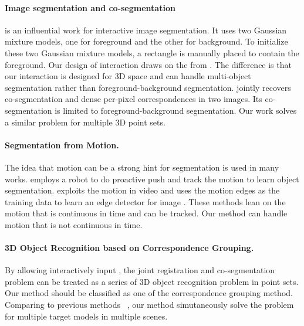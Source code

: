 \paragraph{Image segmentation and co-segmentation}
\cite{grabcut} is an influential work for interactive image segmentation. It uses two Gaussian mixture models, one for foreground and the other for background. 
To initialize these two Gaussian mixture models, a rectangle is manually placed to contain the foreground. Our design of interaction draws on the  from \cite{grabcut}. 
%
The difference is that our interaction is designed for 3D space and can handle multi-object segmentation rather than foreground-background segmentation. \cite{Taniai_2016_CVPR} jointly recovers co-segmentation and dense per-pixel correspondences in two images. 
Its co-segmentation is limited to foreground-background segmentation. Our work solves a similar problem for multiple 3D point sets. 

\paragraph{Segmentation from Motion.}
The idea that motion can be a strong hint for segmentation is used in many works.\cite{Xu:2015:ACS:2816795.2818075} employs a robot to do proactive push and track the motion to learn object segmentation. \cite{unsupervisededge} exploits the motion in  video and uses the motion edges as the training data to learn an edge detector for image . 
These methods lean on the motion that is continuous in time and can be tracked. Our method can handle motion that is not continuous in time.

\paragraph{3D Object Recognition based on Correspondence Grouping.}
By allowing interactively input , the joint registration and co-segmentation problem can be treated as a series of 3D object recognition problem in point sets. Our method should be classified as one of the correspondence grouping method. Comparing to previous methods ~\cite{hough,LOF}, our method simutaneously  solve the problem for multiple target models in multiple scenes.
